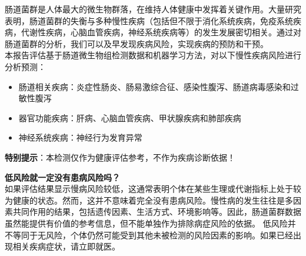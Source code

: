 \documentclass[UTF8]{ctexart}
\begin{document}
\begin{tcolorbox}[
    enhanced,
    colback=customTealBg,
    colframe=gray!5,
    arc=3mm,
    boxrule=0pt,
    width=\textwidth,
    top=8pt,
    bottom=8pt
]
{\small{\color{customTeal}\faInfoCircle}
肠道菌群是人体最大的微生物群落，在维持人体健康中发挥着关键作用。大量研究表明，肠道菌群的失衡与多种慢性疾病（包括但不限于消化系统疾病，免疫系统疾病，代谢性疾病，心脑血管疾病，神经系统疾病等）的发生发展密切相关。通过对肠道菌群的分析，我们可以及早发现疾病风险，实现疾病的预防和干预。\\

本报告评估基于肠道微生物组检测数据和机器学习方法，对以下慢性疾病风险进行分析预测：
\begin{itemize}
    \item 肠道相关疾病：炎症性肠炎、肠易激综合征、感染性腹泻、肠道病毒感染和过敏性腹泻
    \item 器官功能疾病：肝病、心脑血管疾病、甲状腺疾病和肺部疾病
    \item 神经系统疾病：神经行为发育异常
\end{itemize}


{\color{orange}\faExclamationTriangle} \textbf{特别提示}：本检测仅作为健康评估参考，不作为疾病诊断依据！}
\end{tcolorbox}

\begin{tcolorbox}[
    enhanced,
    colback=lightpurple!10, %
    colframe=lightpurple!10,  %
    arc=3mm,
    boxrule=0.5pt,
    width=\textwidth,
    top=8pt,
    bottom=8pt
]
{\small{\color{lightpurple}\faQuestionCircle}\quad \textbf{低风险就一定没有患病风险吗？}\\
{\color{orange!50}\faComments}\quad 如果评估结果显示慢病风险较低，这通常表明个体在某些生理或代谢指标上处于较为健康的状态。然而，这并不意味着完全没有患病风险。慢性病的发生往往是多因素共同作用的结果，包括遗传因素、生活方式、环境影响等。因此，肠道菌群数据虽然能提供有价值的参考信息，但不能单独作为排除病症风险的依据。
低风险并不等同于无风险，个体仍然可能受到其他未被检测的风险因素的影响。如果已经出现相关疾病症状，请立即就医。
}
\end{tcolorbox}
\end{document}
